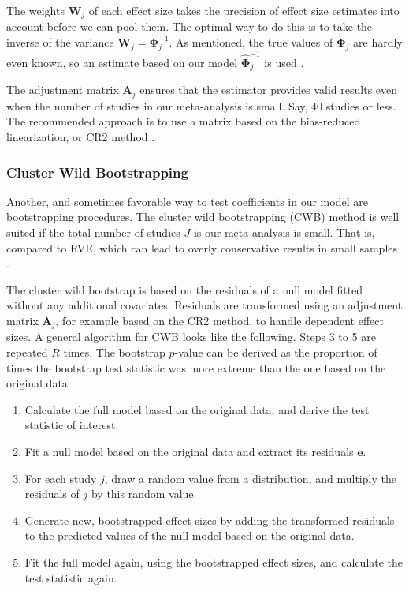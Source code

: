 \documentclass[../../../main.tex]{subfiles}
\begin{document}
The weights $\bm{W}_j$ of each effect size takes the precision of effect size estimates into account before we can pool them. The optimal way to do this is to take the inverse of the variance $\bm{W}_j=\bm{\Phi}_j^{-1}$. As mentioned, the true values of $\bm{\Phi}_j$ are hardly even known, so an estimate based on our model $\hat{\bm{\Phi}}_j^{-1}$ is used \autocite{Harrer2021}.

The adjustment matrix $\bm{A}_j$ ensures that the estimator provides valid results even when the number of studies in our meta-analysis is small. Say, 40 studies or less. The recommended approach is to use a matrix based on the bias-reduced linearization, or CR2 method \autocite{Harrer2021}.

\subsubsection{Cluster Wild Bootstrapping}

Another, and sometimes favorable way to test coefficients in our model are bootstrapping procedures. The cluster wild bootstrapping (CWB) method is well suited if the total number of studies $J$ is our meta-analysis is small. That is, compared to RVE, which can lead to overly conservative results in small samples \autocite{Harrer2021}.

The cluster wild bootstrap is based on the residuals of a null model fitted without any additional covariates. Residuals are transformed using an adjustment matrix $\bm{A}_j$, for example based on the CR2 method, to handle dependent effect sizes. A general algorithm for CWB looks like the following. Steps 3 to 5 are repeated $R$ times. The bootstrap $p$-value can be derived as the proportion of times the bootstrap test statistic was more extreme than the one based on the original data \autocite{Harrer2021}.

\begin{tcolorbox}[title=The Cluster Wild Bootstrapping Algorithm \autocite{Harrer2021}]
\begin{enumerate}[leftmargin=*, label=\arabic*.]
\item Calculate the full model based on the original data, and derive the test statistic of interest.
\item Fit a null model based on the original data and extract its residuals $\bm{e}$.
\item For each study $j$, draw a random value from a distribution, and multiply the residuals of $j$ by this random value.
\item Generate new, bootstrapped effect sizes by adding the transformed residuals to the predicted values of the null model based on the original data.
\item Fit the full model again, using the bootstrapped effect sizes, and calculate the test statistic again.
\end{enumerate}
\end{tcolorbox}
\end{document}
